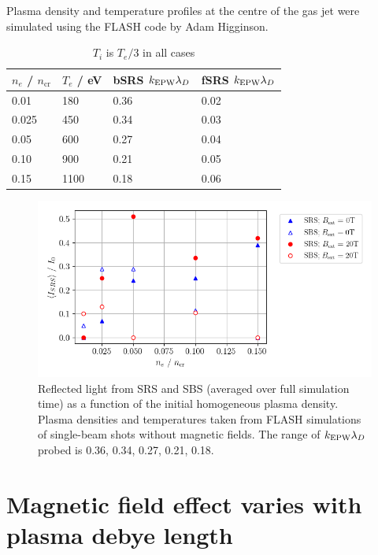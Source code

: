Plasma density and temperature profiles at the centre of the gas jet were simulated using the FLASH code by Adam Higginson. 

\begin{table}[h]
\begin{center}

\begin{tabular}{|l|l|l|l|}
\hline
$n_e$ / $n_{\mathrm{cr}}$ & $T_e$ / eV & bSRS $k_\mathrm{EPW}\lambda_D$ & fSRS $k_\mathrm{EPW}\lambda_D$\\ \hline \hline
0.01 & 180 & 0.36 & 0.02 \\ \hline
0.025& 450 & 0.34 & 0.03 \\ \hline
0.05 & 600 & 0.27 & 0.04 \\ \hline
0.10 & 900 & 0.21 &  0.05\\ \hline
0.15 & 1100 & 0.18 & 0.06 \\ \hline

\end{tabular}

\end{center}
\caption{$T_i$ is $T_e/3$ in all cases}
\label{tab:LULI_setup}
\end{table}


\begin{figure}[ht]
   \centering
    \includegraphics[width=\columnwidth]{Chapters/C6_magSRS/LULI_sims_v3.png}
    \caption{Reflected light from SRS and SBS (averaged over full simulation time) as a function of the initial homogeneous plasma density. Plasma densities and temperatures taken from FLASH simulations of single-beam shots without magnetic fields. The range of $k_\mathrm{EPW}\lambda_D$ probed is 0.36, 0.34, 0.27, 0.21, 0.18.}
    \label{fig:LULI_sims_v3}
\end{figure}{}



\section{Magnetic field effect varies with plasma debye length}

